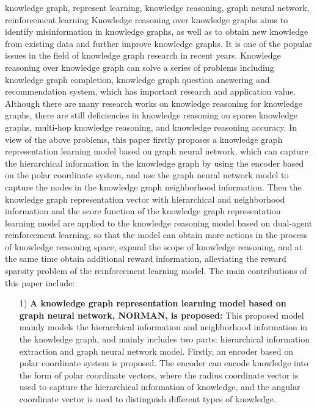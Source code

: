 \documentclass[algorithmlist, AutoFakeBold, AutoFakeSlant, figurelist, tablelist, nomlist, engineering, openany]{seuthesix} %
\begin{document}
\begin{englishabstract}{knowledge graph, represent learning, knowledge reasoning, graph neural network, reinforcement learning}
  Knowledge reasoning over knowledge graphs aims to identify misinformation in knowledge graphs, as well as to obtain new knowledge from existing data and further improve knowledge graphs. It is one of the popular issues in the field of knowledge graph research in recent years.
  Knowledge reasoning over knowledge graph can solve a series of problems including knowledge graph completion, knowledge graph question answering and recommendation system, which has important research and application value.
  Although there are many research works on knowledge reasoning for knowledge graphs, there are still deficiencies in knowledge reasoning on sparse knowledge graphs, multi-hop knowledge reasoning, and knowledge reasoning accuracy.
  In view of the above problems, this paper firstly proposes a knowledge graph representation learning model based on graph neural network, which can capture the hierarchical information in the knowledge graph by using the encoder based on the polar coordinate system, and use the graph neural network model to capture the nodes in the knowledge graph neighborhood information.
  Then the knowledge graph representation vector with hierarchical and neighborhood information and the score function of the knowledge graph representation learning model are applied to the knowledge reasoning model based on dual-agent reinforcement learning, so that the model can obtain more actions in the process of knowledge reasoning space, expand the scope of knowledge reasoning, and at the same time obtain additional reward information, alleviating the reward sparsity problem of the reinforcement learning model.
  The main contributions of this paper include:
  \begin{itemize}
    \item [1)]\textbf{A knowledge graph representation learning model based on graph neural network, NORMAN, is proposed:}
    This proposed model mainly models the hierarchical information and neighborhood information in the knowledge graph, and mainly includes two parts: hierarchical information extraction and graph neural network model.
    Firstly, an encoder based on polar coordinate system is proposed. The encoder can encode knowledge into the form of polar coordinate vectors, where the radius coordinate vector is used to capture the hierarchical information of knowledge, and the angular coordinate vector is used to distinguish different types of knowledge.

\end{itemize}
\end{englishabstract}
\end{document}
